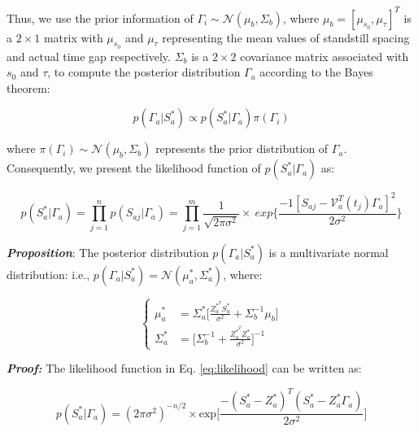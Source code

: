 \documentclass{article}
\begin{document}
Thus, we use the prior information of $\Gamma_i \sim \mathcal{N}(\mu_b, \Sigma_b)$, where $\mu_b = [\mu_{s_0}, \mu_\tau]^T$ is a $2\times1$ matrix with $\mu_{s_0}$ and $\mu_\tau$ representing the mean values of standstill spacing and actual time gap respectively. $\Sigma_b$ is a $2\times2$ covariance matrix associated with $s_0$ and $\tau$, to compute the posterior distribution $\Gamma_a$ according to the Bayes theorem:

\begin{equation}
     p(\Gamma_a | S^*_a) \propto p(S_a^*|\Gamma_a)\pi(\Gamma_i) 
\end{equation}

where $\pi(\Gamma_i)\sim \mathcal{N}(\mu_b,\Sigma_b)$ represents the prior distribution of $\Gamma_a$. Consequently, we present the likelihood function of $p(S_a^*|\Gamma_a)$ as:

\begin{equation}
\label{eq:likelihood}
    p(S_a^*|\Gamma_a) = \prod^{n}_{j=1}{p(S_{aj}|\Gamma_a)} = \prod^{m}_{j=1}{\frac{1}{\sqrt{2\pi\sigma^2}}\times\ exp\{\frac{-1[S_{aj}-\mathcal{V}_a^T(t_j)\Gamma_a]^2}{2\sigma^2}\}}
\end{equation}

\noindent \textbf{\emph{Proposition}}: The posterior distribution $p(\Gamma_a|S^*_a)$ is a multivariate normal distribution: i.e., $p(\Gamma_a|S_a^*) = \mathcal{N}(\mu_a^*, \Sigma^*_a)$, where: 

\begin{equation}
    \begin{cases}
    \mu^*_a &= \Sigma_a^* \Bigg[ \frac{Z_a^{*^T} S_a^*}{\sigma^2} + \Sigma_b^{-1} \mu_b\Bigg]  \\
    
    \Sigma_a^* &= \Bigg[\Sigma_b^{-1} + \frac{Z_a^{*^T}Z_a^*}{\sigma^2} \Bigg]^{-1}
    \end{cases}
\end{equation}

\noindent \textbf{\emph{Proof:}} The likelihood function in Eq. \ref{eq:likelihood} can be written as: 

\begin{equation}
    p(S_a^*|\Gamma_a) = (2\pi\sigma^2)^{-n/2} \times \text{exp}\big[\frac{-(S^*_a - Z_a^*)^T(S_a^* - Z_a^*\Gamma_a)}{2\sigma^2}\big]
\end{equation}
\end{document}
